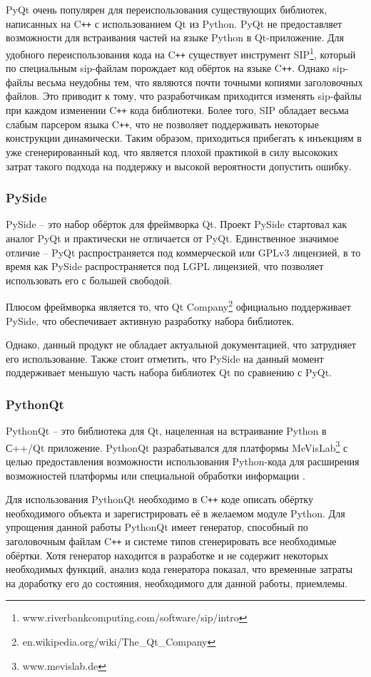 \documentclass[14pt]{matmex-diploma-custom}
\begin{document}
PyQt очень популярен для переиспользования существующих библиотек, написанных на C\texttt{++} с использованием Qt из Python. PyQt не предоставляет возможности для встраивания частей на языке Python в Qt-приложение. Для удобного переиспользования кода на C\texttt{++} существует инструмент SIP\footnote{www.riverbankcomputing.com/software/sip/intro}, который по специальным sip-файлам порождает код обёрток на языке C\texttt{++}. Однако sip-файлы весьма неудобны тем, что являются почти точными копиями заголовочных файлов. Это приводит к тому, что разработчикам приходится изменять sip-файлы при каждом изменении C\texttt{++} кода библиотеки. Более того, SIP обладает весьма слабым парсером языка C\texttt{++}, что не позволяет поддерживать некоторые конструкции динамически. Таким образом, приходиться прибегать к инъекциям в уже сгенерированный код, что является плохой практикой в силу высококих затрат такого подхода на поддержку и высокой вероятности допустить ошибку.

\subsubsection{PySide}
PySide -- это набор обёрток для фреймворка Qt. Проект PySide стартовал как аналог PyQt и практически не отличается от PyQt. Единственное значимое отличие -- PyQt распространяется под коммерческой или GPLv3 лицензией, в то время как PySide распространяется под LGPL лицензией, что позволяет использовать его с большей свободой. 

Плюсом фреймворка является то, что Qt Company\footnote{en.wikipedia.org/wiki/The\_Qt\_Company} официально поддерживает PySide, что обеспечивает активную разработку набора библиотек. 

Однако, данный продукт не обладает актуальной документацией, что затрудняет его использование. Также стоит отметить, что PySide на данный момент поддерживает меньшую часть набора библиотек Qt по сравнению с PyQt.

\subsubsection{PythonQt}
PythonQt -- это библиотека для Qt, нацеленная на встраивание Python в С++/Qt приложение. PythonQt разрабатывался для платформы MeVisLab\footnote{www.mevislab.de} с целью предоставления возможности использования Python-кода для расширения возможностей платформы или специальной обработки информации \cite{heckelMeVisLab}. 

Для использования PythonQt необходимо в C\texttt{++} коде описать обёртку необходимого объекта и зарегистрировать её в желаемом модуле Python. Для упрощения данной работы PythonQt имеет генератор, способный по заголовочным файлам C\texttt{++} и системе типов сгенерировать все необходимые обёртки. Хотя генератор находится в разработке и не содержит некоторых необходимых функций, анализ кода генератора показал, что временные затраты на доработку его до состояния, необходимого для данной работы, приемлемы.
\end{document}
